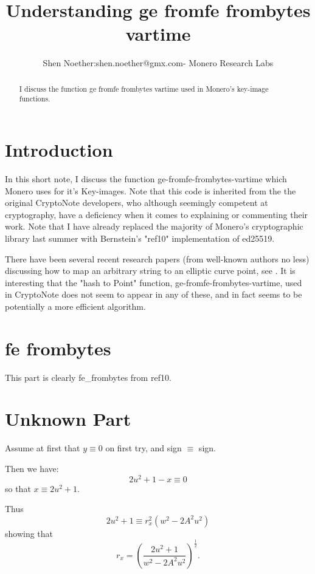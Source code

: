 \documentclass[12pt,oneside,english]{amsart}
\numberwithin{equation}{section}
\numberwithin{figure}{section}
\theoremstyle{plain}
\theoremstyle{plain}
\theoremstyle{remark}
\theoremstyle{plain}
\theoremstyle{remark}
\theoremstyle{remark}
\theoremstyle{plain}
\theoremstyle{definition}
\begin{document}
\lstset{language=C} 


\title{Understanding ge fromfe frombytes vartime}


\author{Shen Noether:shen.noether@gmx.com- Monero Research Labs}
\begin{abstract}
I discuss the function ge fromfe frombytes vartime used in Monero's key-image functions. 
\end{abstract}

\maketitle

\tableofcontents
\section{Introduction}
In this short note, I discuss the function ge-fromfe-frombytes-vartime which Monero uses for it's Key-images. Note that this code is inherited from the the original CryptoNote developers, who although seemingly competent at cryptography, have a deficiency when it comes to explaining or commenting their work. Note that I have already replaced the majority of Monero's cryptographic library last summer with Bernstein's "ref10" implementation of ed25519.
\par
There have been several recent research papers (from well-known authors no less) discussing how to map an arbitrary string to an elliptic curve point, see \cite{Tib2010,Tib2013}. It is interesting that the "hash to Point" function, ge-fromfe-frombytes-vartime, used in CryptoNote \cite{CN} does not seem to appear in any of these, and in fact seems to be potentially a more efficient algorithm. 
\section{fe frombytes}
This part is clearly fe\_frombytes from ref10. 
\section{Unknown Part}
Assume at first that $y\equiv 0$ on first try, and sign $\equiv $ sign. 

\par

Then we have: 
\[
2u^2 + 1 - x \equiv 0
\]
so that $x\equiv 2u^2 + 1$. 

Thus 
\[
2u^2 + 1 \equiv r_x^2 (w^2 - 2A^2 u^2)
\]
showing that 
\[
r_x = \left(\frac{2u^2 + 1}{w^2 - 2A^2 u^2}\right)^{\frac{1}{2}}.
\]
\end{document}
